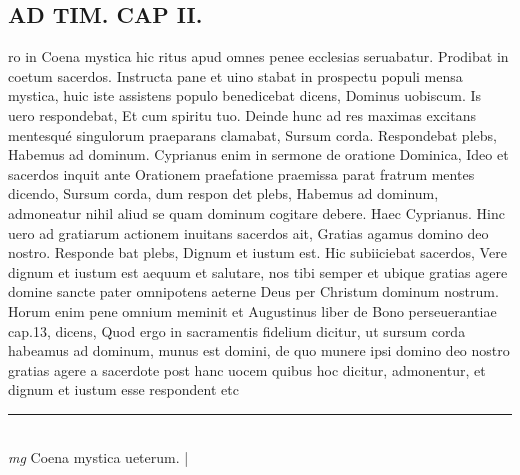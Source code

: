 \documentclass{article}
\begin{document}
\begin{pages}
\section*{AD TIM. CAP II. }
\marginpar{[ p.109 ]}\pstart ro in Coena mystica hic ritus apud omnes penee ecclesias seruabatur. Prodibat in coetum sacerdos. Instructa pane et uino stabat in prospectu populi mensa mystica, huic iste assistens populo benedicebat dicens, Dominus uobiscum. Is uero respondebat, Et cum spiritu tuo. Deinde hunc ad res maximas excitans mentesqué singulorum praeparans clamabat, Sursum corda. Respondebat plebs, Habemus ad dominum. Cyprianus enim in sermone de oratione Dominica, Ideo et sacerdos inquit ante Orationem praefatione praemissa parat fratrum mentes dicendo, Sursum corda, dum respon det plebs, Habemus ad dominum, admoneatur nihil aliud se quam dominum cogitare debere. Haec Cyprianus. Hinc uero ad gratiarum actionem inuitans sacerdos ait, Gratias agamus domino deo nostro. Responde bat plebs, Dignum et iustum est. Hic subiiciebat sacerdos, Vere dignum et iustum est aequum et salutare, nos tibi semper et ubique gratias agere domine sancte pater omnipotens aeterne Deus per Christum dominum nostrum. Horum enim pene omnium meminit et Augustinus liber  de Bono perseuerantiae cap.13, dicens, Quod ergo in sacramentis fidelium dicitur, ut sursum corda habeamus ad dominum, munus est domini, de quo munere ipsi domino deo nostro gratias agere a sacerdote post hanc uocem quibus hoc dicitur, admonentur, et dignum et iustum esse respondent etc  \pend
\vspace{0.5cm}\noindent
\vspace{0.2cm}\rule{1cm}{0.2pt}\\ 
\hspace{0.2cm}\textit{mg}
\footnotesize Coena mystica ueterum. 
\normalsize| 

\end{pages}
\end{document}
